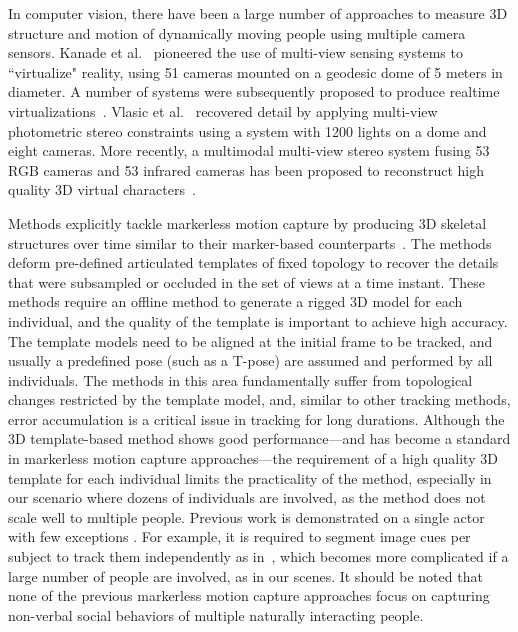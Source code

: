 In computer vision, there have been a large number of approaches to measure 3D structure and motion of dynamically moving people using multiple camera sensors. Kanade et al.~\cite{Kanade-1997} pioneered the use of multi-view sensing systems to ``virtualize" reality, using 51 cameras mounted on a geodesic dome of 5 meters in diameter. A number of systems were subsequently proposed to produce realtime virtualizations~\cite{Matusik-2000,Matsuyama-2002,Gross-2003,Petit-2009}. Vlasic et al.~\cite{Vlasic-2009} recovered detail by applying multi-view photometric stereo constraints using a system with 1200 lights on a dome and eight cameras. More recently, a multimodal multi-view stereo system fusing 53 RGB cameras and 53 infrared cameras has been proposed to reconstruct high quality 3D virtual characters~\cite{Collet-15}. 

Methods explicitly tackle markerless motion capture by producing 3D skeletal structures over time similar to their marker-based counterparts~\cite{Gall-09, Gavrila-96, Cheung-05,Plankers-03, Bregler-04, Kehl-06, Corazza-10, Vlasic-08, Brox-10, Stoll-11, deAguiar-2008, Vlasic-2008, Furukawa-2008}. The methods deform pre-defined articulated templates of fixed topology to recover the details that were subsampled or occluded in the set of views at a time instant. These methods require an offline method to generate a rigged 3D model for each individual, and the quality of the template is important to achieve high accuracy. The template models need to be aligned at the initial frame to be tracked, and usually a predefined pose (such as a T-pose) are assumed and performed by all individuals. The methods in this area fundamentally suffer from topological changes restricted by the template model, and, similar to other tracking methods, error accumulation is a critical issue in tracking for long durations. Although the 3D template-based method shows good performance---and has become a standard in markerless motion capture approaches---the requirement of a high quality 3D template for each individual limits the practicality of the method, especially in our scenario where dozens of individuals are involved, as the method does not scale well to multiple people. Previous work is demonstrated on a single actor with few exceptions \cite{Ye-2012, Liu-2013}. For example, it is required to segment image cues per subject to track them independently as in~\cite{Liu-2013}, which becomes more complicated if a large number of people are involved, as in our scenes. It should be noted that none of the previous markerless motion capture approaches focus on capturing non-verbal social behaviors of multiple naturally interacting people.





